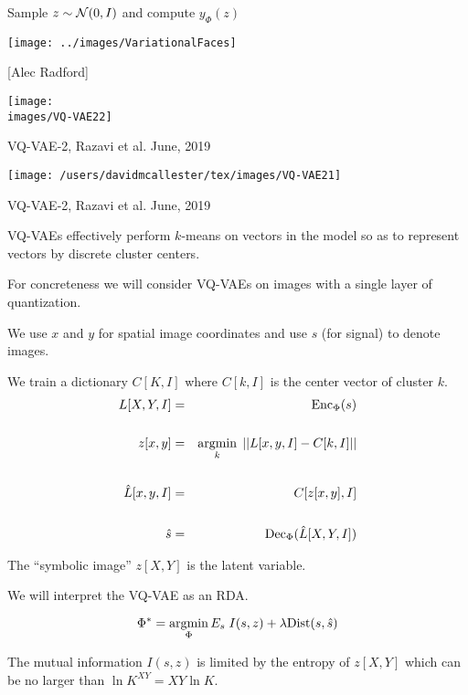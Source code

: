 {

\centerline{Sample {\color{red} $z \sim {\cal N}(0,I)$} and compute {\color{red} $y_\Phi(z)$}}

\vfill
\centerline{\texttt{[image: ../images/VariationalFaces]}}
\centerline{[Alec Radford]}


\centerline{\texttt{[image: \\images/VQ-VAE22]}}

\vfill
VQ-VAE-2, Razavi et al. June, 2019


\centerline{\texttt{[image: /users/davidmcallester/tex/images/VQ-VAE21]}}

\vfill
VQ-VAE-2, Razavi et al. June, 2019



VQ-VAEs effectively perform $k$-means on vectors in the model so as to represent vectors by discrete cluster centers.

\vfill
For concreteness we will consider VQ-VAEs on images with a single layer of quantization.

\vfill
We use $x$ and $y$ for spatial image coordinates and use $s$ (for signal) to denote images.


We train a dictionary $C[K,I]$ where $C[k,I]$ is the center vector of cluster $k$.
\begin{eqnarray*}
L[X,Y,I] & = & \mathrm{Enc}_\Phi(s) \\
\\
z[x,y] & = & \operatorname*{argmin}_k \;||L[x,y,I] - C[k,I]|| \\
\\
\hat{L}[x,y,I] & = & C[z[x,y],I] \\
\\
\hat{s} & = & \mathrm{Dec}_\Phi(\hat{L}[X,Y,I])
\end{eqnarray*}

\vfill
The ``symbolic image'' $z[X,Y]$ is the latent variable.


We will interpret the VQ-VAE as an RDA.

$$\Phi^*  =  \operatorname*{argmin}_\Phi E_s\;I(s,z) + \lambda\mathrm{Dist}(s,\hat{s})$$

\vfill
The mutual information $I(s,z)$ is limited by the entropy of $z[X,Y]$ which can be no larger than $\ln K^{XY} = XY\ln K$.

}
